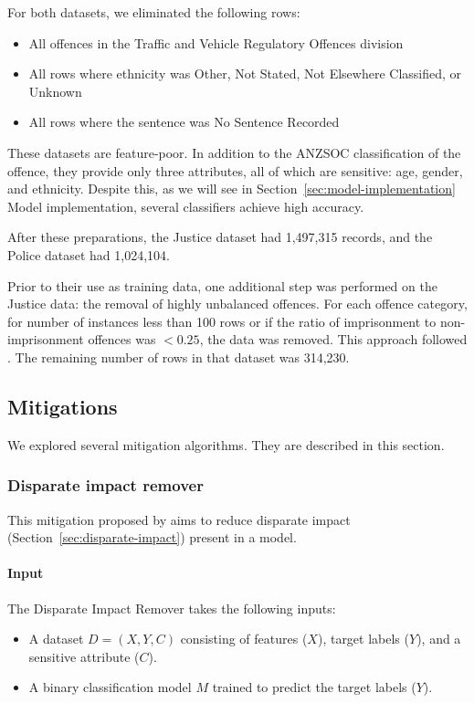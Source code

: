 \documentclass[runningheads]{llncs}
\begin{document}
For both datasets, we eliminated the following rows:
\begin{itemize}
\item All offences in the Traffic and Vehicle Regulatory Offences
    division
\item All rows where ethnicity was Other, Not Stated, Not Elsewhere
    Classified, or Unknown
\item All rows where the sentence was No Sentence Recorded
\end{itemize}

These datasets are feature-poor. In addition to the ANZSOC
classification of the offence, they provide only three attributes, all
of which are sensitive: age, gender, and ethnicity. Despite this, as
we will see in Section~\ref{sec:model-implementation} Model
implementation, several classifiers achieve high accuracy.

After these preparations, the Justice dataset had 1,497,315 records,
and the Police dataset had 1,024,104.

Prior to their use as training data, one additional step was performed
on the Justice data: the removal of highly unbalanced offences. For
each offence category, for number of instances less than 100 rows or
if the ratio of imprisonment to non-imprisonment offences was
$< 0.25$, the data was removed. This approach followed
\cite{ali2019imbalance}. The remaining number of rows in that dataset
was 314,230.


\subsection{Mitigations}
\label{sec:mitigations}

We explored several mitigation algorithms. They are described in this
section.

\subsubsection{Disparate impact remover}
This mitigation proposed by \cite{feldman2015certifying} aims to
reduce disparate impact (Section~\ref{sec:disparate-impact}) present
in a model.

\paragraph{Input} The Disparate Impact Remover takes the following
inputs:
\begin{itemize}
\item A dataset $D = (X, Y, C)$ consisting of features ($X$), target
    labels ($Y$), and a sensitive attribute ($C$).
\item A binary classification model $M$ trained to predict the target
    labels ($Y$).
\end{itemize}
\end{document}
